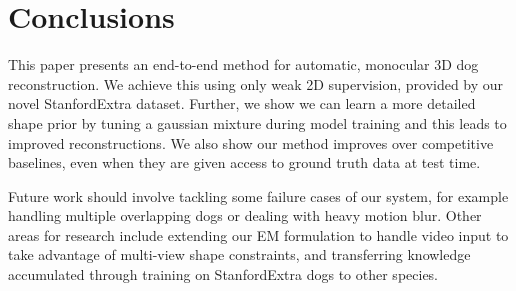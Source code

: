 
\section{Conclusions}
This paper presents an end-to-end method for automatic, monocular 3D dog reconstruction. We achieve this using only weak 2D supervision, provided by our novel StanfordExtra dataset. Further, we show we can learn a more detailed shape prior by tuning a gaussian mixture during model training and this leads to improved reconstructions. We also show our method improves over competitive baselines, even when they are given access to ground truth data at test time.

Future work should involve tackling some failure cases of our system, for example handling multiple overlapping dogs or dealing with heavy motion blur. Other areas for research include extending our EM formulation to handle video input to take advantage of multi-view shape constraints, and transferring knowledge accumulated through training on StanfordExtra dogs to other species.

% 


